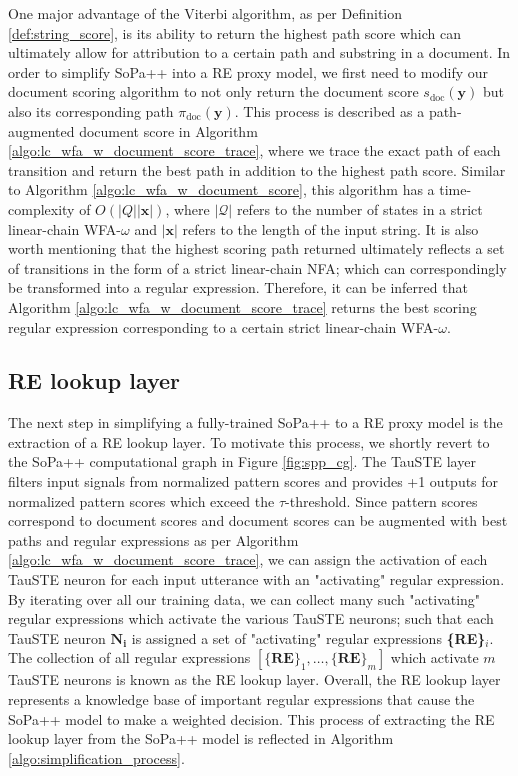 One major advantage of the Viterbi algorithm, as per Definition
\ref{def:string_score}, is its ability to return the highest path score which
can ultimately allow for attribution to a certain path and substring in a
document. In order to simplify SoPa++ into a RE proxy model, we first need to
modify our document scoring algorithm to not only return the document score
$s_{\text{doc}}(\bm{y})$ but also its corresponding path
$\pi_{\text{doc}}(\bm{y})$. This process is described as a path-augmented
document score in Algorithm \ref{algo:lc_wfa_w_document_score_trace}, where we
trace the exact path of each transition and return the best path in addition to
the highest path score. Similar to Algorithm \ref{algo:lc_wfa_w_document_score},
this algorithm has a time-complexity of $O(|Q||\bm{x}|)$, where
$|\mathcal{Q}|$ refers to the number of states in a strict linear-chain
WFA-$\omega$ and $|\bm{x}|$ refers to the length of the input string. It is also
worth mentioning that the highest scoring path returned ultimately reflects a set of
transitions in the form of a strict linear-chain NFA; which can correspondingly
be transformed into a regular expression. Therefore, it can be inferred that
Algorithm \ref{algo:lc_wfa_w_document_score_trace} returns the best scoring
regular expression corresponding to a certain strict linear-chain WFA-$\omega$.

\subsection{RE lookup layer}

The next step in simplifying a fully-trained SoPa++ to a RE proxy model is the
extraction of a RE lookup layer. To motivate this process, we shortly revert to
the SoPa++ computational graph in Figure \ref{fig:spp_cg}. The TauSTE layer
filters input signals from normalized pattern scores and provides +1 outputs for
normalized pattern scores which exceed the $\tau$-threshold. Since pattern
scores correspond to document scores and document scores can be augmented with
best paths and regular expressions as per Algorithm
\ref{algo:lc_wfa_w_document_score_trace}, we can assign the activation of each
TauSTE neuron for each input utterance with an "activating" regular expression.
By iterating over all our training data, we can collect many such "activating"
regular expressions which activate the various TauSTE neurons; such that each
TauSTE neuron $\bm{N_i}$ is assigned a set of "activating" regular expressions
\textbf{\{RE\}$_i$}. The collection of all regular expressions
$[\{\textbf{RE}\}_1, \ldots, \{\textbf{RE}\}_m]$ which activate $m$ TauSTE
neurons is known as the RE lookup layer. Overall, the RE lookup layer represents
a knowledge base of important regular expressions that cause the SoPa++ model to
make a weighted decision. This process of extracting the RE lookup layer from
the SoPa++ model is reflected in Algorithm \ref{algo:simplification_process}.

